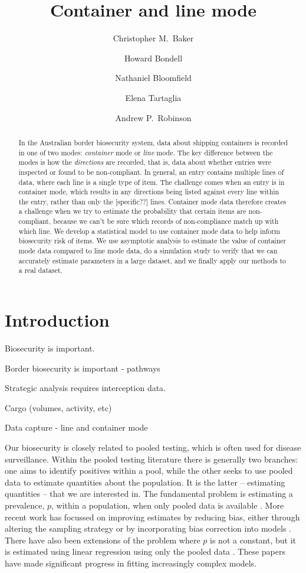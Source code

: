 \documentclass{article}
\title{Container and line mode}
\author{Christopher M.\ Baker \and Howard Bondell \and Nathaniel Bloomfield \and Elena Tartaglia \and Andrew P.\ Robinson}
\begin{document}
  
\maketitle

\begin{abstract}
In the Australian border biosecurity system, data about shipping containers is recorded in one of two modes: \emph{container} mode or \emph{line} mode. The key difference between the modes is how the \emph{directions} are recorded, that is, data about whether entries were inspected or found to be non-compliant. In general, an entry contains multiple lines of data, where each line is a single type of item. The challenge comes when an entry is in container mode, which results in any directions being listed against every line within the entry, rather than only the [specific??] lines. Container mode data therefore creates a challenge when we try to estimate the probability that certain items are non-compliant, because we can't be sure which records of non-compliance match up with which line. We develop a statistical model to use container mode data to help inform biosecurity risk of items. We use asymptotic analysis to estimate the value of container mode data compared to line mode data, do a simulation study to verify that we can accurately estimate parameters in a large dataset, and we finally apply our methods to a real dataset. 
\end{abstract}

\section{Introduction}

Biosecurity is important.

Border biosecurity is important - pathways

Strategic analysis requires interception data.

Cargo (volumes, activity, etc)

Data capture - line and container mode

Our biosecurity is closely related to pooled testing, which is often used for disease surveillance. Within the pooled testing literature there is generally two branches: one aims to identify positives within a pool, while the other seeks to use pooled data to estimate quantities about the population. It is the latter -- estimating quantities -- that we are interested in. The fundamental problem is estimating a prevalence, \(p\), within a population, when only pooled data is available \citep{thompson_estimation_1962}. More recent work has focussed on improving estimates by reducing bias, either through altering the sampling strategy \citep{schaarschmidt_experimental_2007,hepworth_debiased_2009} or by incorporating bias correction into models  \citep{hepworth_bias_2017,hepworth_bias_2021}. There have also been extensions of the problem where \(p\) is not a constant, but it is estimated using linear regression using only the pooled data \citep{delaigle_nonparametric_2015, chatterjee_regression_2020, mcmahan_bayesian_2017, liu_generalized_2020}. These papers have made significant progress in fitting increasingly complex models.
\end{document}
